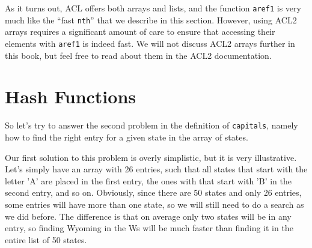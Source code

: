 \begin{aside}
As it turns out, ACL offers both arrays and lists, and the function
\texttt{aref1} is very much like the ``fast \texttt{nth}'' that we
describe in this section. However, using ACL2 arrays requires a
significant amount of care to ensure that accessing their elements
with \texttt{aref1} is indeed fast. We will not discuss ACL2 arrays
further in this book, but feel free to read about them in the ACL2
documentation.
\end{aside}

\section{Hash Functions}

So let's try to answer the second problem in the definition of
\texttt{capitals}, namely how to find the right entry for a given
state in the array of states.

Our first solution to this problem is overly simplistic, but it is
very illustrative. Let's simply have an array with 26 entries,
such that all states that start with the letter 'A' are placed in
the first entry, the ones with that start with 'B' in the second
entry, and so on. Obviously, since there are 50 states and only
26 entries, some entries will have more than one state, so we will
still need to do a search as we did before. The difference is that
on average only two states will be in any entry, so finding 
Wyoming in the Ws will be much faster than finding it in the entire 
list of 50 states.

